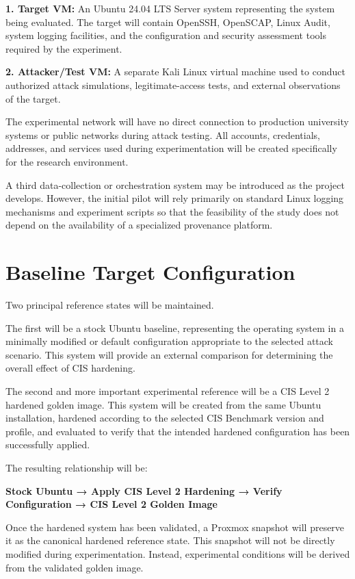 \documentclass[11pt]{article}
\begin{document}
\textbf{1. Target VM:} An Ubuntu 24.04 LTS Server system representing the
system being evaluated. The target will contain OpenSSH, OpenSCAP, Linux
Audit, system logging facilities, and the configuration and security
assessment tools required by the experiment.

\textbf{2. Attacker/Test VM:} A separate Kali Linux virtual machine used to
conduct authorized attack simulations, legitimate-access tests, and
external observations of the target.

The experimental network will have no direct connection to production
university systems or public networks during attack testing. All
accounts, credentials, addresses, and services used during
experimentation will be created specifically for the research
environment.

A third data-collection or orchestration system may be introduced as the
project develops. However, the initial pilot will rely primarily on
standard Linux logging mechanisms and experiment scripts so that the
feasibility of the study does not depend on the availability of a
specialized provenance platform.
\section{Baseline Target Configuration}
\label{sec:orgba9cf8b}
Two principal reference states will be maintained.

The first will be a stock Ubuntu baseline, representing the operating
system in a minimally modified or default configuration appropriate to
the selected attack scenario. This system will provide an external
comparison for determining the overall effect of CIS hardening.

The second and more important experimental reference will be a CIS Level
2 hardened golden image. This system will be created from the same
Ubuntu installation, hardened according to the selected CIS Benchmark
version and profile, and evaluated to verify that the intended hardened
configuration has been successfully applied.

The resulting relationship will be:


\textbf{Stock Ubuntu → Apply CIS Level 2 Hardening → Verify Configuration → CIS
Level 2 Golden Image}


Once the hardened system has been validated, a Proxmox snapshot will
preserve it as the canonical hardened reference state. This snapshot
will not be directly modified during experimentation. Instead,
experimental conditions will be derived from the validated golden image.
\end{document}
